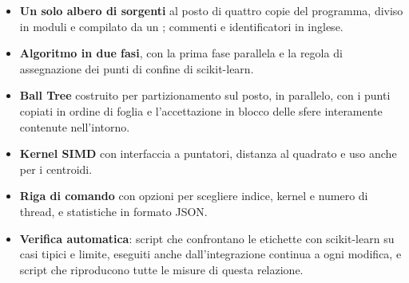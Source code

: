 \begin{itemize}
    \item \textbf{Un solo albero di sorgenti} al posto di quattro copie del programma, diviso in moduli e compilato da un ; commenti e identificatori in inglese.
    \item \textbf{Algoritmo in due fasi}, con la prima fase parallela e la regola di assegnazione dei punti di confine di scikit-learn.
    \item \textbf{Ball Tree} costruito per partizionamento sul posto, in parallelo, con i punti copiati in ordine di foglia e l'accettazione in blocco delle sfere interamente contenute nell'intorno.
    \item \textbf{Kernel SIMD} con interfaccia a puntatori, distanza al quadrato e uso anche per i centroidi.
    \item \textbf{Riga di comando} con opzioni per scegliere indice, kernel e numero di thread, e statistiche in formato JSON.
    \item \textbf{Verifica automatica}: script che confrontano le etichette con scikit-learn su casi tipici e limite, eseguiti anche dall'integrazione continua a ogni modifica, e script che riproducono tutte le misure di questa relazione.
\end{itemize}
